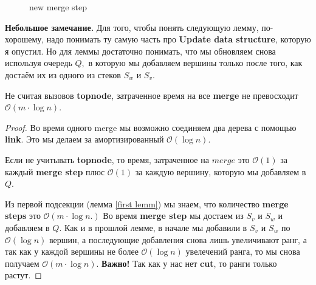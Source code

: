 \begin{figure}[h]
\caption{new merge step}
\label{new merge}
\end{figure}

\textbf{Небольшое замечание.} Для того, чтобы понять следующую лемму, по-хорошему, надо понимать ту самую часть про \textbf{Update data structure}, которую я опустил. Но для леммы достаточно понимать, что мы обновляем снова используя очередь $Q,$ в которую мы добавляем вершины только после того, как достаём их из одного из стеков $S_w$ и $S_v.$

\begin{lemma}
Не считая вызовов \textbf{topnode}, затраченное время на все \textbf{merge} не превосходит $\mathcal{O}(m\cdot\log{n}).$
\end{lemma}
\begin{proof}
Во время одного merge мы возможно соединяем два дерева с помощью \textbf{link}. Это мы делаем за амортизированный $\mathcal{O}(\log{n}).$ 

Если не учитывать \textbf{topnode}, то время, затраченное на $merge$ это $\mathcal{O}(1)$ за каждый \textbf{merge step} плюс $\mathcal{O}(1)$ за каждую вершину, которую мы добавляем в $Q.$

Из первой подсекции (лемма \ref{first lemm}) мы знаем, что количество \textbf{merge steps} это $\mathcal{O}(m\cdot\log{n}.)$ Во время \textbf{merge step} мы достаем из $S_v$ и $S_w$ и добавляем в $Q.$ Как и в прошлой лемме, в начале мы добавили в $S_v$ и $S_w$ по $\mathcal{O}(\log{n})$ вершин, а последующие добавления снова лишь увеличивают ранг, а так как у каждой вершины не более $\mathcal{O}(\log{n})$ увелечений ранга, то мы снова получаем $\mathcal{O}(m\cdot\log{n}).$ \textbf{Важно!} Так как у нас нет \textbf{cut}, то ранги только растут.

\end{proof}

